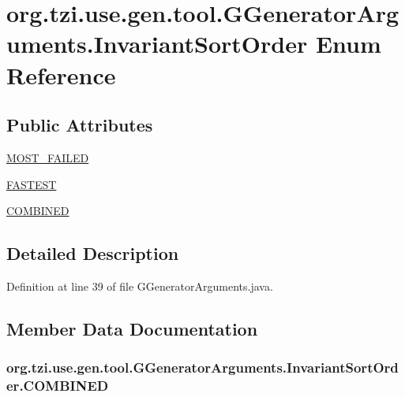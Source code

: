 \hypertarget{enumorg_1_1tzi_1_1use_1_1gen_1_1tool_1_1_g_generator_arguments_1_1_invariant_sort_order}{\section{org.\-tzi.\-use.\-gen.\-tool.\-G\-Generator\-Arguments.\-Invariant\-Sort\-Order Enum Reference}
\label{enumorg_1_1tzi_1_1use_1_1gen_1_1tool_1_1_g_generator_arguments_1_1_invariant_sort_order}
}
\subsection*{Public Attributes}
\begin{DoxyCompactItemize}
\item 
\hyperlink{enumorg_1_1tzi_1_1use_1_1gen_1_1tool_1_1_g_generator_arguments_1_1_invariant_sort_order_abfbf5e715a94e36166c15c1cd1d93316}{M\-O\-S\-T\-\_\-\-F\-A\-I\-L\-E\-D}
\item 
\hyperlink{enumorg_1_1tzi_1_1use_1_1gen_1_1tool_1_1_g_generator_arguments_1_1_invariant_sort_order_a01be97387558ee41497c88fe12e583d6}{F\-A\-S\-T\-E\-S\-T}
\item 
\hyperlink{enumorg_1_1tzi_1_1use_1_1gen_1_1tool_1_1_g_generator_arguments_1_1_invariant_sort_order_ab2df91b5df130d00f4a75f70c670be54}{C\-O\-M\-B\-I\-N\-E\-D}
\end{DoxyCompactItemize}


\subsection{Detailed Description}


Definition at line 39 of file G\-Generator\-Arguments.\-java.



\subsection{Member Data Documentation}
\hypertarget{enumorg_1_1tzi_1_1use_1_1gen_1_1tool_1_1_g_generator_arguments_1_1_invariant_sort_order_ab2df91b5df130d00f4a75f70c670be54}{
\subsubsection[{C\-O\-M\-B\-I\-N\-E\-D}]{\setlength{\rightskip}{0pt plus 5cm}org.\-tzi.\-use.\-gen.\-tool.\-G\-Generator\-Arguments.\-Invariant\-Sort\-Order.\-C\-O\-M\-B\-I\-N\-E\-D}}\label{enumorg_1_1tzi_1_1use_1_1gen_1_1tool_1_1_g_generator_arguments_1_1_invariant_sort_order_ab2df91b5df130d00f4a75f70c670be54}


